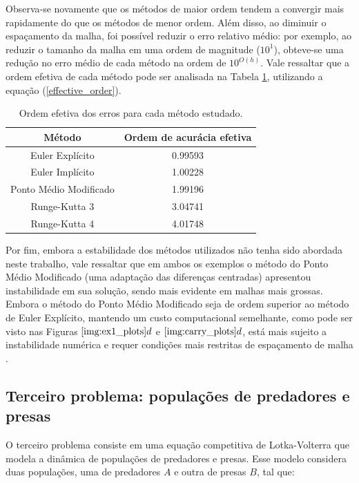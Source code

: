Observa-se novamente que os métodos de maior ordem tendem a convergir mais rapidamente do que os métodos de menor ordem. Além disso, ao diminuir o espaçamento da malha, foi possível reduzir o erro relativo médio: por exemplo, ao reduzir o tamanho da malha em uma ordem de magnitude ($10^1$), obteve-se uma redução no erro médio de cada método na ordem de $10^{O(h)}$. Vale ressaltar que a ordem efetiva de cada método pode ser analisada na Tabela \ref{tab:carry_effective_order}, utilizando a equação (\ref{effective_order}).

\begin{table}[H]
    \centering
    \begin{tabular}{|c|c|}
        \hline
        Método & Ordem de acurácia efetiva\\
        \hline \rule{0pt}{2.5ex} 
        Euler Explícito & 0.99593\\\rule{0pt}{2.5ex} 
        Euler Implícito & 1.00228\\\rule{0pt}{2.5ex} 
        Ponto Médio Modificado & 1.99196\\\rule{0pt}{2.5ex} 
        Runge-Kutta 3 & 3.04741\\\rule{0pt}{2.5ex} 
        Runge-Kutta 4 & 4.01748\\
         \hline
    \end{tabular}
    \caption{Ordem efetiva dos erros para cada método estudado.}
    \label{tab:carry_effective_order}
\end{table}

Por fim, embora a estabilidade dos métodos utilizados não tenha sido abordada neste trabalho, vale ressaltar que em ambos os exemplos o método do Ponto Médio Modificado (uma adaptação das diferenças centradas) apresentou instabilidade em sua solução, sendo mais evidente em malhas mais grossas. Embora o método do Ponto Médio Modificado seja de ordem superior ao método de Euler Explícito, mantendo um custo computacional semelhante, como pode ser visto nas Figuras $\ref{img:ex1_plots}d$ e $\ref{img:carry_plots}d$, está mais sujeito a instabilidade numérica e requer condições mais restritas de espaçamento de malha \cite{ascher2008numerical}.

\subsection{Terceiro problema: populações de predadores e presas}\label{problem-3} \quad
O terceiro problema consiste em uma equação competitiva de Lotka-Volterra \cite{goel1971} que modela a dinâmica de populações de predadores e presas. Esse modelo considera duas populações, uma de predadores $A$ e outra de presas $B$, tal que:

